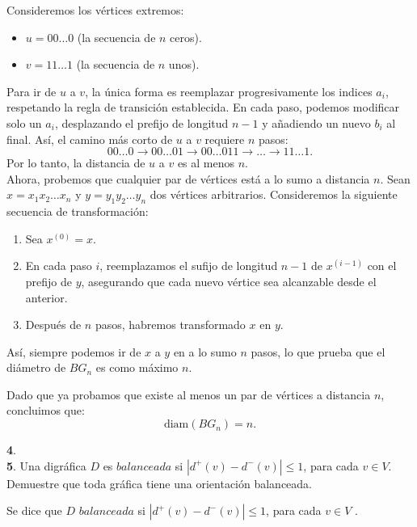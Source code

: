 \documentclass[12pt]{article}
\begin{document}
Consideremos los vértices extremos:
\begin{itemize}
    \item \( u = 00\ldots0 \) (la secuencia de \( n \) ceros).
    \item \( v = 11\ldots1 \) (la secuencia de \( n \) unos).
\end{itemize}
Para ir de \( u \) a \( v \), la única forma es reemplazar progresivamente los indices $a_i$, 
respetando la regla de transición establecida. En cada paso, podemos modificar solo un $a_i$, desplazando el prefijo de longitud \( n-1 \) y añadiendo un nuevo $b_i$ al final. Así, el camino más corto de \( u \) a \( v \) requiere \( n \) pasos:
\[
00\ldots0 \to 00\ldots01 \to 00\ldots011 \to \dots \to 11\ldots1.
\]
Por lo tanto, la distancia de \( u \) a \( v \) es al menos \( n \).\\

Ahora, probemos que cualquier par de vértices está a lo sumo a distancia \( n \). Sean \( x = x_1x_2 \dots x_n \) y \( y = y_1y_2 \dots y_n \) dos vértices arbitrarios. Consideremos la siguiente secuencia de transformación:
\begin{enumerate}
    \item Sea \( x^{(0)} = x \).
    \item En cada paso \( i \), reemplazamos el sufijo de longitud \( n-1 \) de \( x^{(i-1)} \) con el prefijo de \( y \), asegurando que cada nuevo vértice sea alcanzable desde el anterior.
    \item Después de \( n \) pasos, habremos transformado \( x \) en \( y \).
\end{enumerate}
Así, siempre podemos ir de \( x \) a \( y \) en a lo sumo \( n \) pasos, lo que prueba que el diámetro de \( BG_n \) es como máximo \( n \).

Dado que ya probamos que existe al menos un par de vértices a distancia \( n \), concluimos que:
\[
\text{diam}(BG_n) = n.
\]


\vspace{1cm}
%
%
\textbf{4}. \\

%
%
\textbf{5}. Una digráfica $D$ es $balanceada$ si $|d^+(v)-d^-(v)| \leq 1$, para cada $v \in V$. 
Demuestre que toda gráfica tiene una orientación balanceada.


\begin{tcolorbox}[title=\textbf{Hipotesis}, colback=red!15!white, colframe=black!]
    Se dice que $D$ $balanceada$ si $|d^+(v)-d^-(v)| \leq 1$, para cada $v \in V$ .
\end{tcolorbox}
\end{document}
